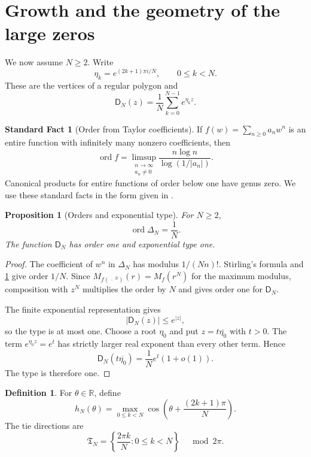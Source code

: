 \documentclass[11pt]{article}
\newtheorem{proposition}[proposition]{Proposition}
\theoremstyle{definition}
\newtheorem{definition}[definition]{Definition}
\newtheorem{standardfact}[standardfact]{Standard Fact}
\theoremstyle{remark}
\newcommand{\Dfun}{\mathsf D}
\newcommand{\ord}{\operatorname{ord}}
\begin{document}
\section{Growth and the geometry of the large zeros}\label{sec:zero_geometry}

We now assume $N\geq2$.  Write
\[
\eta_k=e^{(2k+1)\pi i/N},
\qquad 0\leq k<N.
\]
These are the vertices of a regular polygon and
\[
\Dfun_N(z)=\frac1N\sum_{k=0}^{N-1}e^{\eta_kz}.
\]

\begin{standardfact}[Order from Taylor coefficients]\label{sf:coefficient_order}
If $f(w)=\sum_{n\geq0}a_nw^n$ is an entire function with infinitely many nonzero coefficients, then
\[
\ord f
=
\limsup_{\substack{n\to\infty\\a_n\ne0}}
\frac{n\log n}{\log(1/|a_n|)}.
\]
Canonical products for entire functions of order below one have genus zero.  We use these standard facts in the form given in \cite{Boas1954,Titchmarsh1939}.
\end{standardfact}

\begin{proposition}[Orders and exponential type]\label{prop:orders}
For $N\geq2$,
\[
\ord\Delta_N=\frac1N.
\]
The function $\Dfun_N$ has order one and exponential type one.
\end{proposition}

\begin{proof}
The coefficient of $w^n$ in $\Delta_N$ has modulus $1/(Nn)!$.
Stirling's formula and \cref{sf:coefficient_order} give order $1/N$.
Since $M_{f(\,\cdot\,^N)}(r)=M_f(r^N)$ for the maximum modulus,
composition with $z^N$ multiplies the order by $N$ and gives order one
for $\Dfun_N$.

The finite exponential representation gives
\[
|\Dfun_N(z)|\leq e^{|z|},
\]
so the type is at most one.  Choose a root $\eta_0$ and put $z=t\overline{\eta_0}$ with $t>0$.  The term $e^{\eta_0z}=e^t$ has strictly larger real exponent than every other term.  Hence
\[
\Dfun_N(t\overline{\eta_0})
=
\frac1Ne^t(1+o(1)).
\]
The type is therefore one.
\end{proof}


\begin{definition}\label{def:indicator_polygon}
For $\theta\in\mathbb R$, define
\[
h_N(\theta)
=
\max_{0\leq k<N}
\cos\left(\theta+\frac{(2k+1)\pi}{N}\right).
\]
The tie directions are
\[
\mathfrak T_N
=
\left\{\frac{2\pi k}{N}:0\leq k<N\right\}
\quad\bmod 2\pi.
\]
\end{definition}
\end{document}
